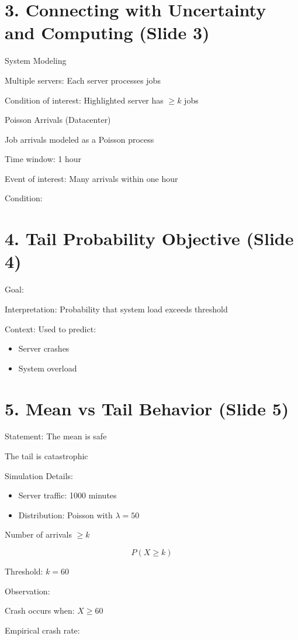 \documentclass[12pt]{article}
\begin{document}
\section*{3. Connecting with Uncertainty and Computing (Slide 3)}

System Modeling

Multiple servers: Each server processes jobs

Condition of interest: Highlighted server has $\ge k$ jobs

Poisson Arrivals (Datacenter)

Job arrivals modeled as a Poisson process

Time window: 1 hour

Event of interest: Many arrivals within one hour

Condition:

\section*{4. Tail Probability Objective (Slide 4)}

Goal:

Interpretation: Probability that system load exceeds threshold

Context: Used to predict:
\begin{itemize}
\item Server crashes
\item System overload
\end{itemize}

\section*{5. Mean vs Tail Behavior (Slide 5)}

Statement: The mean is safe

The tail is catastrophic

Simulation Details:
\begin{itemize}
\item Server traffic: 1000 minutes
\item Distribution: Poisson with $\lambda = 50$
\end{itemize}

Number of arrivals $\ge k$

\[
P(X \ge k)
\]

Threshold: $k = 60$

Observation:

Crash occurs when: $X \ge 60$

Empirical crash rate:
\end{document}

